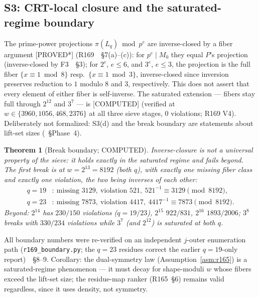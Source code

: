 \documentclass[11pt,a4paper]{article}
\newtheorem{theorem}{Theorem}
\theoremstyle{definition}
\begin{document}
\subsection{S3: CRT-local closure and the saturated-regime boundary}

The prime-power projections $\pi(L_q)\bmod p^e$ are inverse-closed by a
fiber argument [PROVED*] (R169~\cite{R169}~\S7(a)--(c)): for $p^e\mid M_0$
they equal $P$'s projection (inverse-closed by F3~\cite{R169}~\S3); for
$2^e$, $e\le6$, and $3^e$, $e\le3$, the projection is the full fiber
$\{x\equiv1\bmod8\}$ resp.\ $\{x\equiv1\bmod3\}$, inverse-closed since
inversion preserves reduction to $1$ modulo $8$ and $3$, respectively.
This does not assert that every element of either fiber is self-inverse. The saturated
extension --- fibers stay full through $2^{12}$ and $3^7$ ---
is [COMPUTED] (verified at $w\in\{3960,1056,468,2376\}$ at all three
sieve stages, 0 violations; R169 V4). Deliberately not formalized: S3(d)
and the break boundary are statements about lift-set sizes
(\cite{R186}~\S Phase~4).

\begin{theorem}[Break boundary; COMPUTED]
  \label{thm:boundary}
  Inverse-closure is not a universal property of the sieve: it holds
  exactly in the saturated regime and fails beyond. The first break is
  at $w=2^{13}=8192$ (both $q$), with exactly one missing fiber class
  and exactly one violation, the two being inverses of each other:
  \begin{equation}
    \label{eq:break}
    \begin{aligned}
      q=19&:\ \text{missing }3129,\ \text{violation }521,\
            521^{-1}\equiv3129\pmod{8192},\\
      q=23&:\ \text{missing }7873,\ \text{violation }4417,\
            4417^{-1}\equiv7873\pmod{8192}.
    \end{aligned}
  \end{equation}
  Beyond: $2^{14}$ has $230/150$ violations ($q=19/23$),
  $2^{15}$ $922/831$, $2^{16}$ $1893/2006$; $3^8$ breaks with $330/234$
  violations while $3^7$ (and $2^{12}$) is saturated at both $q$.
\end{theorem}
All boundary numbers were re-verified on an independent $j$-outer
enumeration path (\texttt{r169\_boundary.py}; the $q=23$ residues
correct the earlier $q=19$-only report)~\cite{R169}~\S8--9. Corollary:
the dual-symmetry law (Assumption~\ref{asm:r165}) is a saturated-regime
phenomenon --- it must decay for shape-moduli $w$ whose fibers exceed
the lift-set size; the residue-map ranker (R165~\S6) remains valid
regardless, since it uses density, not symmetry.
\end{document}
